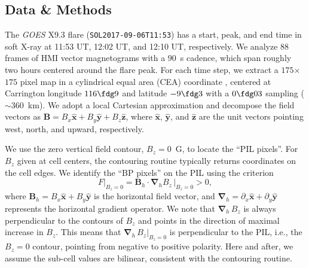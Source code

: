 \documentclass[times,twocolumn]{aastex631}
\begin{document}
\begin{CJK*}{UTF8}{gbsn}

\section{Data \& Methods}
\label{sec:data}

The \textit{GOES} X9.3 flare (\texttt{SOL2017-09-06T11:53}) has a start, peak, and end time in soft X-ray at 11:53 UT, 12:02 UT, and 12:10 UT, respectively. We analyze 88 frames of HMI vector magnetograms with a $90$~s cadence, which span roughly two hours centered around the flare peak. For each time step, we extract a $175$$\times$$175$ pixel map in a cylindrical equal area (CEA) coordinate \citep{sun2013}, centered at Carrington longitude $116\fdg9$ and latitude $-9\fdg3$ with a $0\fdg03$ sampling ($\sim$$360$~km). We adopt a local Cartesian approximation and decompose the field vectors as $\bm{B}=B_{x}\hat{\bm{x}} + B_{y} \hat{\bm{y}} + B_{z} \hat{\bm{z}}$, where $\hat{\bm{x}}$, $\hat{\bm{y}}$, and $\hat{\bm{z}}$ are the unit vectors pointing west, north, and upward, respectively.

We use the zero vertical field contour, $B_z=0$~G, to locate the ``PIL pixels''. For $B_z$ given at cell centers, the contouring routine typically returns coordinates on the cell edges. We identify the ``BP pixels'' on the PIL using the criterion \citep{titov1993}
\begin{equation}
\left.F\right | _{B_z=0} = \left. \bm{B}_h \cdot \bm{\nabla}_h B_z\, \right | _{B_z=0} > 0,	
\label{eqn:titov_car}
\end{equation}
where $\bm{B}_h=B_{x}\hat{\bm{x}} + B_{y} \hat{\bm{y}}$ is the horizontal field vector, and $\bm{\nabla}_h = {\partial}_x \hat{\bm{x}} + {\partial}_y \hat{\bm{y}}$ represents the horizontal gradient operator. We note that $\bm{\nabla}_{h} \, B_{z}$ is always perpendicular to the contours of $B_z$ and points in the direction of maximal increase in $B_z$. This means that $\left. \bm{\nabla}_{h} \, B_{z} \right|_{B_z=0}$ is perpendicular to the PIL, i.e., the $B_z=0$ contour, pointing from negative to positive polarity. Here and after, we assume the sub-cell values are bilinear, consistent with the contouring routine.


\end{CJK*}
\end{document}
